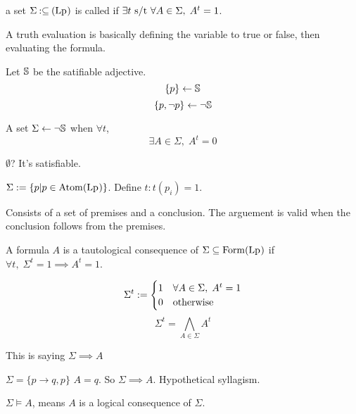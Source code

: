 \documentclass[12pt]{article}
\begin{document}
\bbox
\begin{defn}
  a set \(\Sigma\mathbin{:\subseteq}(\mathrm{Lp_{}})\) is called  if
  \(\exists t\text{ s/t }\forall A\in\Sigma,\;A^t=1\).
\end{defn}
\ebox
A truth evaluation is basically defining the variable to true or false, then
evaluating the formula.
\bboxex
\begin{exam}
  Let \(\mathbb S\) be the satifiable adjective.
  \[\{p\}\leftarrow \mathbb S\]
  \[\{p,\neg p\}\leftarrow \neg \mathbb S\]
\end{exam}
\ebox

\bbox
\begin{defn}
  A set \(\Sigma\leftarrow\neg\mathbb S\) when \(\forall t\), 
  \[\exists A\in\Sigma,\;A^t=0\]
\end{defn}
\ebox

\bboxex
\begin{exam}
  \(\emptyset\)? It's satisfiable.
\end{exam}
\ebox

\bbox
\begin{exam}
  \(\Sigma:=\{p|p\in\mathrm{Atom}(\mathrm{Lp_{}})\}\). Define \(t:t(p_i)=1\).
\end{exam}
\ebox

\bbox
\begin{defn}[Arguement]
  Consists of a set of premises and a conclusion. The arguement is
  valid when the conclusion follows from the premises.

  A formula \(A\) is a tautological consequence of \(\Sigma\subseteq\mathrm{Form}(\mathrm{Lp_{}})\)
  if \(\forall t,\;\Sigma^t=1\implies A^t=1\).

  \[
    \Sigma^t:=\begin{cases}1&\forall A\in\Sigma,\;A^t=1\\ 0&\mathrm{otherwise}\end{cases}
  \]
  \[
    \Sigma^t=\bigwedge_{A\in\Sigma}A^t
  \]

  This is saying \(\Sigma\implies A\)
  
\end{defn}
\ebox

\bboxex
\begin{exam}
  \(\Sigma=\{p\to q, p\}\) \(A=q\). So \(\Sigma\implies A\). 
  Hypothetical syllagism.
\end{exam}
\ebox

\bbox
\begin{nota}
  \(\Sigma\models A\), means \(A\) is a logical consequence of \(\Sigma\).
\end{nota}
\ebox
\end{document}
